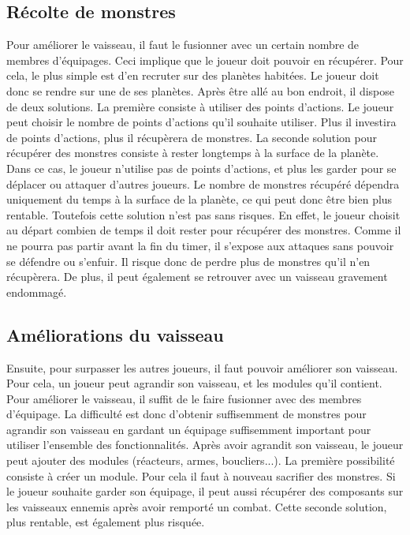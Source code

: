 \documentclass[a4paper,11pt]{report}
\begin{document}
    \subsection{Récolte de monstres}
      Pour améliorer le vaisseau, il faut le fusionner avec un certain nombre de membres d'équipages. Ceci implique que le joueur doit pouvoir en récupérer.
      Pour cela, le plus simple est d'en recruter sur des planètes habitées. Le joueur doit donc se rendre sur une de ses planètes.
      Après être allé au bon endroit, il dispose de deux solutions.
      La première consiste à utiliser des points d'actions. Le joueur peut choisir le nombre de points d'actions qu'il souhaite utiliser.
      Plus il investira de points d'actions, plus il récupèrera de monstres.
      \newline
      La seconde solution pour récupérer des monstres consiste à rester longtemps à la surface de la planète. Dans ce cas, le joueur n'utilise pas de points d'actions, et plus les garder pour se déplacer ou attaquer d'autres joueurs.
      Le nombre de monstres récupéré dépendra uniquement du temps à la surface de la planète, ce qui peut donc être bien plus rentable.
      Toutefois cette solution n'est pas sans risques. En effet, le joueur choisit au départ combien de temps il doit rester pour récupérer des monstres.
      Comme il ne pourra pas partir avant la fin du timer, il s'expose aux attaques sans pouvoir se défendre ou s'enfuir. Il risque donc de perdre plus de monstres qu'il n'en récupèrera.
      De plus, il peut également se retrouver avec un vaisseau gravement endommagé.
    
    \subsection{Améliorations du vaisseau}
      Ensuite, pour surpasser les autres joueurs, il faut pouvoir améliorer son vaisseau. Pour cela, un joueur peut agrandir son vaisseau, et les modules qu'il contient.
      \newline
      Pour améliorer le vaisseau, il suffit de le faire fusionner avec des membres d'équipage. La difficulté est donc d'obtenir suffisemment de monstres pour agrandir son vaisseau en gardant un équipage suffisemment important pour utiliser l'ensemble des fonctionnalités.
      \newline
      Après avoir agrandit son vaisseau, le joueur peut ajouter des modules (réacteurs, armes, boucliers...).
      La première possibilité consiste à créer un module. Pour cela il faut à nouveau sacrifier des monstres. 
      Si le joueur souhaite garder son équipage, il peut aussi récupérer des composants sur les vaisseaux ennemis après avoir remporté un combat.
      Cette seconde solution, plus rentable, est également plus risquée.
      
\end{document}
